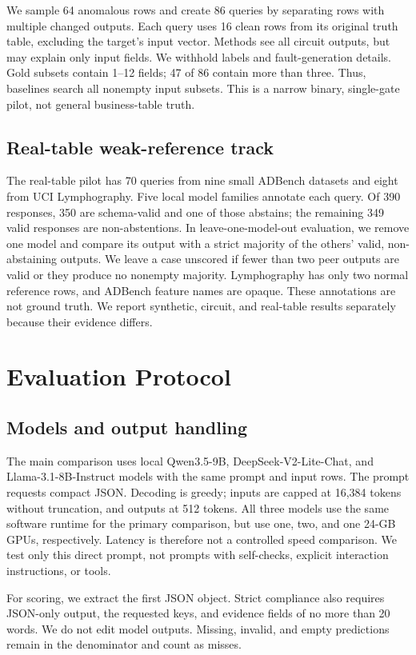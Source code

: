 \documentclass[conference]{IEEEtran}
\begin{document}
We sample 64 anomalous rows and create 86 queries by separating rows with multiple changed outputs. Each query uses 16 clean rows from its original truth table, excluding the target's input vector. Methods see all circuit outputs, but may explain only input fields. We withhold labels and fault-generation details. Gold subsets contain 1--12 fields; 47 of 86 contain more than three. Thus, baselines search all nonempty input subsets. This is a narrow binary, single-gate pilot, not general business-table truth.

\subsection{Real-table weak-reference track}
The real-table pilot has 70 queries from nine small ADBench datasets and eight from UCI Lymphography. Five local model families annotate each query. Of 390 responses, 350 are schema-valid and one of those abstains; the remaining 349 valid responses are non-abstentions. In leave-one-model-out evaluation, we remove one model and compare its output with a strict majority of the others' valid, non-abstaining outputs. We leave a case unscored if fewer than two peer outputs are valid or they produce no nonempty majority. Lymphography has only two normal reference rows, and ADBench feature names are opaque. These annotations are not ground truth. We report synthetic, circuit, and real-table results separately because their evidence differs.



\section{Evaluation Protocol}
\subsection{Models and output handling}
The main comparison uses local Qwen3.5-9B, DeepSeek-V2-Lite-Chat, and Llama-3.1-8B-Instruct models with the same prompt and input rows. The prompt requests compact JSON. Decoding is greedy; inputs are capped at 16,384 tokens without truncation, and outputs at 512 tokens. All three models use the same software runtime for the primary comparison, but use one, two, and one 24-GB GPUs, respectively. Latency is therefore not a controlled speed comparison. We test only this direct prompt, not prompts with self-checks, explicit interaction instructions, or tools.

For scoring, we extract the first JSON object. Strict compliance also requires JSON-only output, the requested keys, and evidence fields of no more than 20 words. We do not edit model outputs. Missing, invalid, and empty predictions remain in the denominator and count as misses.
\end{document}
